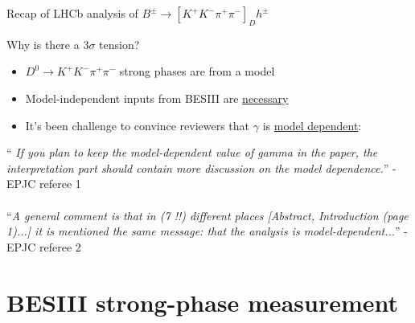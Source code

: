 \documentclass{beamer}
\begin{document}
\begin{frame}{Recap of LHCb analysis of $B^\pm\to[K^+K^-\pi^+\pi^-]_Dh^\pm$}
  \begin{center}
    \Large{Why is there a $3\sigma$ tension?}
  \end{center}
  \begin{itemize}
    \setlength\itemsep{0.3em}
    \item{$D^0\to K^+K^-\pi^+\pi^-$ strong phases are from a model}
    \item{Model-independent inputs from BESIII are \underline{necessary}}
    \item{It's been challenge to convince reviewers that $\gamma$ is \underline{model dependent}:}
  \end{itemize}
  \vspace{0.5cm}
  `` \textit{If you plan to keep the model-dependent value of gamma in the paper, the interpretation part should contain more discussion on the model dependence.}'' - EPJC referee 1 \\~\\
  ``\textit{A general comment is that in (7 !!) different places [Abstract, Introduction (page 1)...] it is mentioned the same message: that the analysis is model-dependent...}'' - EPJC referee 2
\end{frame}

\section{BESIII strong-phase measurement}
\end{document}

